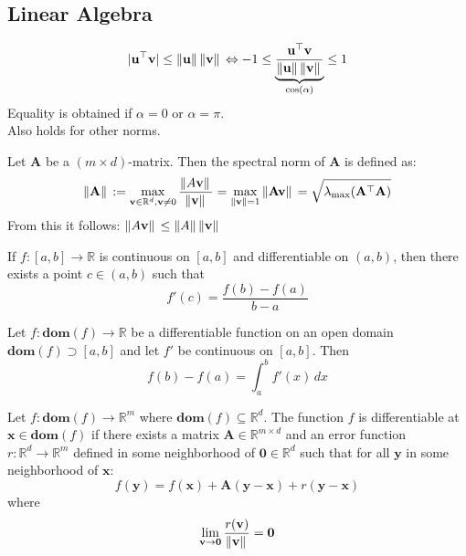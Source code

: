 \subsection{Linear Algebra}

        \begin{equation*}
            |\mathbf{u}^\top \mathbf{v}| \leq \norm*{\mathbf{u}} \norm*{\mathbf{v}} \Leftrightarrow -1 \leq \underbrace{\frac{\mathbf{u}^\top \mathbf{v}}{\norm*{\mathbf{u}} \norm*{\mathbf{v}}}}_{\cos(\alpha)} \leq 1
        \end{equation*}
        Equality is obtained if $\alpha = 0$ or $\alpha = \pi$.\\
        Also holds for other norms.

        Let $\mathbf{A}$ be a $(m \times d)$-matrix. Then the spectral norm of $\mathbf{A}$ is defined as:
        \begin{equation*}
            \norm*{\mathbf{A}} := \max_{\mathbf{v} \in \mathbb{R}^d, \mathbf{v} \neq 0} \frac{\norm*{A \mathbf{v}}}{\norm*{\mathbf{v}}} = \max_{\norm*{\mathbf{v}} = 1} \norm*{\mathbf{A} \mathbf{v}} = \sqrt{\lambda_{\text{max}}(\mathbf{A}^\top \mathbf{A})}
        \end{equation*}
        From this it follows: $\norm*{A \mathbf{v}} \leq \norm*{A} \norm*{\mathbf{v}}$
    
        If $f: [a, b] \rightarrow \mathbb{R}$ is continuous on $[a, b]$ and differentiable on $(a, b)$, then there exists a point $c \in (a, b)$ such that
        \begin{equation*}
            f'(c) = \frac{f(b) - f(a)}{b - a}
        \end{equation*}

        Let $f: \mathbf{dom} (f) \rightarrow \mathbb{R}$ be a differentiable function on an open domain $\mathbf{dom}(f) \supset [a,b]$ and let $f'$ be continuous on $[a,b]$. Then
        \begin{equation*}
            f(b) - f(a) = \int_{a}^{b} f'(x) \, dx
        \end{equation*}

        Let $f: \mathbf{dom} (f) \rightarrow \mathbb{R}^m$ where $\mathbf{dom}(f) \subseteq \mathbb{R}^d$.
        The function $f$ is differentiable at $\mathbf{x} \in \mathbf{dom}(f)$ if there exists a matrix $\mathbf{A} \in \mathbb{R}^{m \times d}$
        and an error function $r: \mathbb{R}^d \to \mathbb{R}^m$ defined in some neighborhood of $\mathbf{0} \in \mathbb{R}^d$ such that for all $\mathbf{y}$ in some neighborhood of $\mathbf{x}$:
        \begin{equation*}
            f(\mathbf{y}) = f(\mathbf{x}) + \mathbf{A}(\mathbf{y} - \mathbf{x}) + r(\mathbf{y} - \mathbf{x})
        \end{equation*}
        where
        \begin{equation*}
            \lim_{\mathbf{v} \to \mathbf{0}} \frac{r(\mathbf{v})}{\norm*{\mathbf{v}}} = \mathbf{0}
        \end{equation*}

